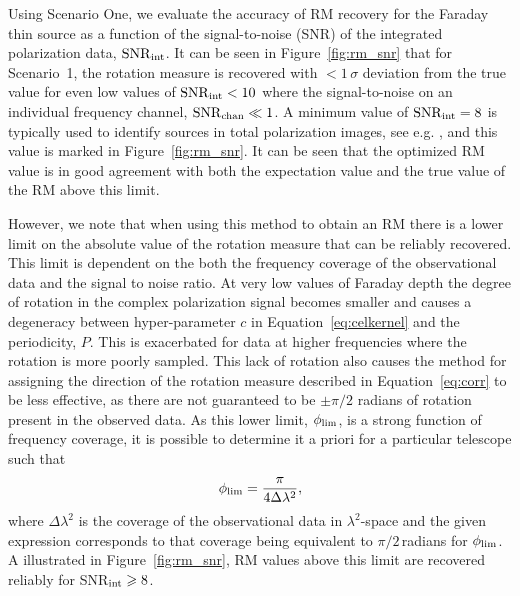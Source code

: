 \documentclass[fleqn,usenatbib]{mnras}
\begin{document}
Using Scenario One, we evaluate the accuracy of RM recovery for the Faraday thin source as a function of the signal-to-noise (SNR) of the integrated polarization data, ${\rm SNR}_{\rm int}$. It can be seen in Figure~\ref{fig:rm_snr} that for Scenario~1, the rotation measure is recovered with $< 1\,\sigma$ deviation from the true value for even low values of ${\rm SNR}_{\rm int}<10$ where the signal-to-noise on an individual frequency channel, ${\rm SNR}_{\rm chan}\ll 1$. A minimum value of ${\rm SNR}_{\rm int}=8$ is typically used to identify sources in total polarization images, see e.g. \cite{george_stil_keller_2012}, and this value is marked in Figure~\ref{fig:rm_snr}. It can be seen that the optimized RM value is in good agreement with both the expectation value and the true value of the RM above this limit.

However, we note that when using this method to obtain an RM there is a lower limit on the absolute value of the rotation measure that can be reliably recovered. This limit is dependent on the both the frequency coverage of the observational data and the signal to noise ratio. At very low values of Faraday depth the degree of rotation in the complex polarization signal becomes smaller and causes a degeneracy between hyper-parameter $c$ in Equation~\ref{eq:celkernel} and the periodicity, $P$. This is exacerbated for data at higher frequencies where the rotation is more poorly sampled. This lack of rotation also causes the method for assigning the direction of the rotation measure described in Equation~\ref{eq:corr} to be less effective, as there are not guaranteed to be $\pm\pi/2$ radians of rotation present in the observed data. As this lower limit, $\phi_{\rm lim}$, is a strong function of frequency coverage, it is possible to determine it a priori for a particular telescope such that
%
\begin{equation}
\label{eq:rmlim}
    \phi_{\rm lim} = \frac{\pi}{4\Delta \lambda^2},
\end{equation}
%
where $\Delta \lambda^2$ is the coverage of the observational data in $\lambda^2$-space and the given expression corresponds to that coverage being equivalent to $\pi/2$\,radians for $\phi_{\rm lim}$.  A illustrated in Figure~\ref{fig:rm_snr}, RM values above this limit are recovered reliably for SNR$_{\rm int}\ge 8$.
\end{document}
